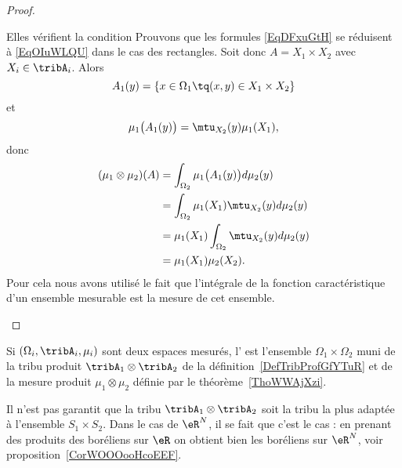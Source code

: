 \begin{proof}
\begin{subproof}
\item[Elles vérifient la condition]
    Prouvons que les formules \eqref{EqDFxuGtH} se réduisent à \eqref{EqOIuWLQU} dans le cas des rectangles. Soit donc \( A=X_1\times X_2\) avec \( X_i\in\tribA_i\). Alors
    \begin{equation}
        A_1(y)=\{ x\in\Omega_1\tq (x,y)\in X_1\times X_2 \}
    \end{equation}
    et
    \begin{equation}
        \mu_1\big( A_1(y) \big)=\mtu_{X_2}(y)\mu_1(X_1),
    \end{equation}
    donc
    \begin{subequations}
        \begin{align}
            (\mu_1\otimes\mu_2)(A)&=\int_{\Omega_2}\mu_1\big( A_1(y) \big)d\mu_2(y)\\
            &=\int_{\Omega_2}\mu_1(X_1)\mtu_{X_2}(y)d\mu_2(y)\\
            &=\mu_1(X_1)\int_{\Omega_2}\mtu_{X_2}(y)d\mu_2(y)\\
            &=\mu_1(X_1)\mu_2(X_2).
        \end{align}
    \end{subequations}
    Pour cela nous avons utilisé le fait que l'intégrale de la fonction caractéristique d'un ensemble mesurable est la mesure de cet ensemble.
    \end{subproof}
\end{proof}

\begin{definition}  \label{DefUMlBCAO}
    Si \( (\Omega_i,\tribA_i,\mu_i)\) sont deux espaces mesurés, l' est l'ensemble \( \Omega_1\times \Omega_2\) muni de la tribu produit \( \tribA_1\otimes \tribA_2\) de la définition~\ref{DefTribProfGfYTuR} et de la mesure produit \( \mu_1\otimes \mu_2\) définie par le théorème~\ref{ThoWWAjXzi}.
\end{definition}

\begin{remark}
    Il n'est pas garantit que la tribu \( \tribA_1\otimes\tribA_2\) soit la tribu la plus adaptée à l'ensemble \( S_1\times S_2\). Dans le cas de \( \eR^N\), il se fait que c'est le cas : en prenant des produits des boréliens sur \( \eR\) on obtient bien les boréliens sur \( \eR^N\), voir proposition~\ref{CorWOOOooHcoEEF}.
\end{remark}

